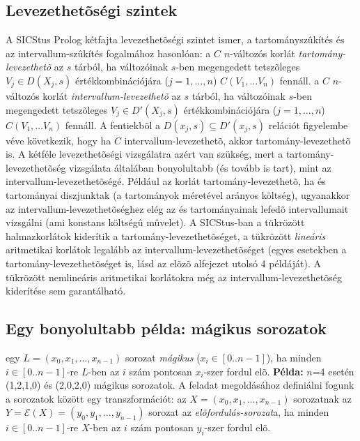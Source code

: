 \subsection{Levezethetõségi szintek}

\label{levezethetoseg}

A SICStus Prolog kétfajta levezethetõségi szintet ismer, a tartományszûkítés
és az intervallum-szûkítés fogalmához hasonlóan:
\br
{} a $C$ $n$-változós korlát \emph{tartomány-levezethetõ} az $s$ tárból,
ha változóinak $s$-ben megengedett tetszõleges $V_j \in D(X_j,s)$ értékkombinációjára
($j = 1, \ldots, n$) $C(V_1, \ldots V_n)$ fennáll.
\br
{} a $C$ $n$-változós korlát \emph{intervallum-levezethetõ} az $s$ tárból,
ha változóinak $s$-ben megengedett tetszõleges $V_j \in D'(X_j,s)$ értékkombinációjára
($j = 1, \ldots, n$) $C(V_1, \ldots V_n)$ fennáll.
\br
A fentiekbõl a $D(x_j,s) \subseteq D'(x_j,s)$ relációt figyelembe véve következik, hogy
ha $C$ intervallum-levezethetõ, akkor tartomány-levezethetõ is. A kétféle levezethetõségi
vizsgálatra azért van szükség, mert a tartomány-levezethetõség vizsgálata általában
bonyolultabb (és tovább is tart), mint az intervallum-levezethetõségé. Például az
 korlát tartomány-levezethetõ, ha  és  tartományai
diszjunktak (a tartományok méretével arányos költség), ugyanakkor az
intervallum-levezethetõséghez elég az  és  tartományainak lefedõ
intervallumait vizsgálni (ami konstans költségû mûvelet).
\br
A SICStus-ban a tükrözött halmazkorlátok kiderítik a tartomány-levezethetõséget, a
tükrözött \emph{lineáris} aritmetikai korlátok legalább az intervallum-levezethetõséget
(egyes esetekben a tartomány-levezethetõséget is, lásd az elõzõ alfejezet utolsó 4
példáját). A tükrözött nemlineáris aritmetikai korlátokra még az intervallum-levezethetõség
kiderítése sem garantálható.

\subsection{Egy bonyolultabb \clpfd példa: mágikus sorozatok}

 egy $L = (x_{0}, x_{1}, \ldots, x_{n-1})$ sorozat \emph{mágikus}
($x_{i} \in [0..n-1]$), ha minden $i \in [0..n-1]$-re $L$-ben az $i$ szám pontosan
$x_{i}$-szer fordul elõ.
\br
{\bf Példa:} $n$=4 esetén (1,2,1,0) és (2,0,2,0) mágikus sorozatok.
\br
A feladat \clpfd megoldásához definiálni fogunk a sorozatok között egy transzformációt:
\br
{} az $X = (x_{0}, x_{1}, \ldots, x_{n-1})$ sorozatnak az
$Y = \mathcal{E}(X) = (y_{0}, y_{1}, \ldots, y_{n-1})$ sorozat az
\emph{elõfordulás-sorozat}a, ha minden $i \in [0..n-1]$-re $X$-ben az $i$ szám
pontosan $y_{i}$-szer fordul elõ.

